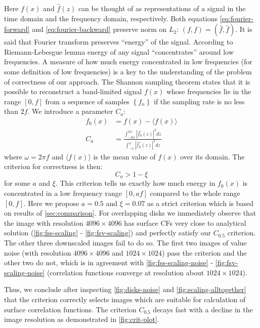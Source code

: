 \documentclass[reprint,amsmath,amssymb,aps,pre,showkeys,showpacs]{revtex4-1}
\begin{document}
Here $f(x)$ and $\hat{f}(z)$ can be thought of as representations of a signal in
the time domain and the frequency domain, respectively. Both equations
\cref{eq:fourier-forward} and \cref{eq:fourier-backward} preserve norm on $L_2$:
$(f, f) = (\hat{f}, \hat{f})$. It is said that Fourier transform preserves
``energy'' of the signal. According to Riemann-Lebesgue lemma \cite{HilbertSpaces}
energy of any signal ``concentrates'' around low frequencies. A measure of how
much energy concentrated in low frequencies (for some definition of low
frequencies) is a key to the understanding of the problem of correctness of our
approach. The Shannon sampling theorem \cite{HilbertSpaces} states that it is
possible to reconstruct a band-limited signal $f(x)$ whose frequencies lie in
the range $[0, f]$ from a sequence of samples $\left\{f_n\right\}$ if the
sampling rate is no less than $2f$. We introduce a parameter $C_a$:
\begin{align*}
  f_0(x) &= f(x) - \langle f(x) \rangle \\
  C_a &= \frac{\int_{-a\omega}^{a\omega} |\hat{f_0}(z)|^2
    dz}{\int_{-\omega}^{\omega} |\hat{f_0}(z)|^2 dz}
\end{align*}
where $\omega = 2\pi f$ and $\langle f(x) \rangle$ is the mean value of $f(x)$
over its domain. The criterion for correctness is then:
\begin{equation*}
  C_a > 1 - \xi
\end{equation*}
for some $a$ and $\xi$. This criterion tells us exactly how much energy in
$f_0(x)$ is concentrated in a low frequency range $[0, af]$ compared to the
whole range $[0, f]$. Here we propose $a = 0.5$ and $\xi = 0.07$ as
a strict criterion which is based on results of
\cref{sec:comparison}. For overlapping disks we immediately observe that the
image with resolution $4096 \times 4096$ has surface CFs very close to
analytical solution (\cref{fig:fss-scaling} - \cref{fig:fsv-scaling}) and
perfectly satisfy our $C_{0.5}$ criterion. The other three downscaled images
fail to do so. The first two images of value noise (with
resolution $4096 \times 4096$ and $1024 \times 1024$) pass the criterion and the
other two do not, which is in agreement with \cref{fig:fss-scaling-noise} -
\cref{fig:fsv-scaling-noise} (correlation functions converge at resolution about
$1024 \times 1024$).

Thus, we conclude after inspecting \cref{fig:disks-noise} and
\cref{fig:scaling-alltogether} that the criterion correctly selects images which
are suitable for calculation of surface correlation functions. The criterion
$C_{0.5}$ decays fast with a decline in the image resolution as demonstrated in
\cref{fig:crit-plot}.
\end{document}
